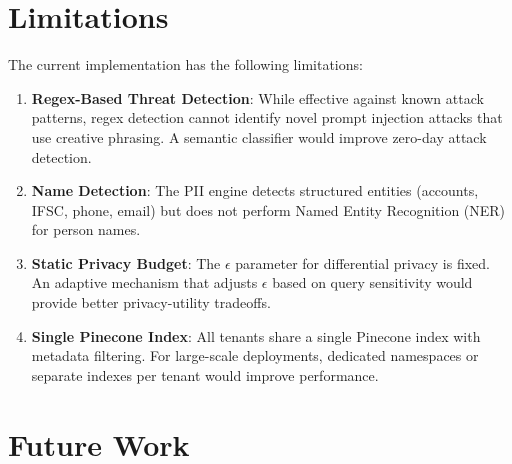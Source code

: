 \section{Limitations}

The current implementation has the following limitations:

\begin{enumerate}
    \item \textbf{Regex-Based Threat Detection}: While effective against known attack patterns, regex detection cannot identify novel prompt injection attacks that use creative phrasing. A semantic classifier would improve zero-day attack detection.
    
    \item \textbf{Name Detection}: The PII engine detects structured entities (accounts, IFSC, phone, email) but does not perform Named Entity Recognition (NER) for person names.
    
    \item \textbf{Static Privacy Budget}: The $\epsilon$ parameter for differential privacy is fixed. An adaptive mechanism that adjusts $\epsilon$ based on query sensitivity would provide better privacy-utility tradeoffs.
    
    \item \textbf{Single Pinecone Index}: All tenants share a single Pinecone index with metadata filtering. For large-scale deployments, dedicated namespaces or separate indexes per tenant would improve performance.
\end{enumerate}

\section{Future Work}

